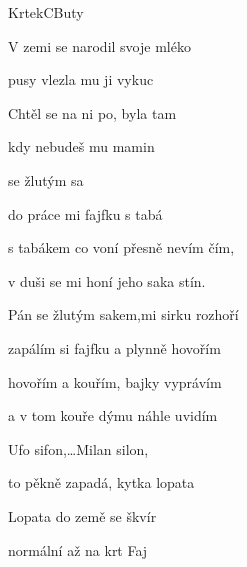 ﻿\setcounter{page}{45}
\begin{song}{Krtek}{C}{Buty}

\begin{SBChorus*}

V zemi se narodil   svoje mléko 

 pusy vlezla mu   ji vykuc 

Chtěl se na ni po,  byla tam 

kdy nebudeš   mu mamin

\end{SBChorus*}

\begin{SBChorus*}

 se žlutým sa

do práce mi  fajfku s tabá

s tabákem co voní přesně nevím čím,

v duši se mi honí jeho saka stín.

Pán se žlutým sakem,mi sirku rozhoří

zapálím si fajfku a plynně hovořím

hovořím a kouřím, bajky vyprávím

a v tom kouře dýmu náhle uvidím

Ufo sifon,…Milan silon,

to pěkně zapadá, kytka lopata

\end{SBChorus*}

\begin{SBChorus*}

Lopata do země  se škvír

 normální   až na krt Faj

\end{SBChorus*}

\end{song}

\clearpage
